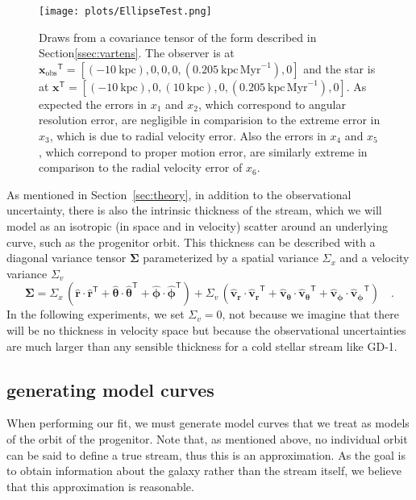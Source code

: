 \documentclass[12pt,preprint]{aastex}
\theoremstyle{plain}
\theoremstyle{definition}
\newcommand{\mtensor}[1]{\boldsymbol{#1}}
\newcommand{\mSigma}{\mtensor{\Sigma}}
\newcommand{\mvector}[1]{\mtensor{#1}}
\renewcommand{\vr}{\mvector{r}}
\newcommand{\vv}{\mvector{v}}
\newcommand{\vx}{\mvector{x}}
\newcommand{\vtheta}{\mvector{\theta}}
\newcommand{\vphi}{\mvector{\phi}}
\newcommand{\transpose}[1]{{#1}^{\textsf{T}}}
\newcommand{\rhat}{\hat{\vr}}
\newcommand{\thetahat}{\hat{\vtheta}}
\newcommand{\phihat}{\hat{\vphi}}
\newcommand{\vhat}{\hat{\vv}}
\newcommand{\unit}[1]{\mathrm{#1}}
\newcommand{\kpc}{\unit{kpc}}
\newcommand{\Myr}{\unit{Myr}}
\newcommand{\kpcpMyr}{\kpc\,\Myr^{-1}}
\newcommand{\vxobs}{\vx_{\mathrm{obs}}}
\newcommand{\sectionname}{Section}
\begin{document}
\begin{figure}[ht]
\begin{center}
\texttt{[image: plots/EllipseTest.png]}
\caption{Draws from a covariance tensor of the form described in \sectionname \ref{ssec:vartens}. The observer is at $\transpose{\vxobs} =  [(-10~\kpc), 0, 0, 0, (0.205~\kpcpMyr), 0]$ and the star is at $\transpose{\vx} = [(-10~\kpc), 0, (10~\kpc), 0, (0.205~\kpcpMyr), 0]$. As expected the errors in $x_1$ and $x_2$, which correspond to angular resolution error, are negligible in comparision to the extreme error in $x_3$, which is due to radial velocity error. Also the errors in $x_4$ and $x_5$, which correpond to proper motion error, are similarly extreme in comparison to the radial velocity error of $x_6$.}
\label{fig:EllipseTest}
\end{center}
\end{figure}

As mentioned in \sectionname~\ref{sec:theory}, in addition to the observational uncertainty, there is also the
intrinsic thickness of the stream, which we will model as an isotropic
(in space and in velocity) scatter around an underlying curve, such as the progenitor orbit.  This
thickness can be described with a diagonal variance tensor $\mSigma$
parameterized by a spatial variance $\Sigma_x$ and a velocity variance
$\Sigma_v$
\begin{equation}
\mSigma =
  \Sigma_x\,(\rhat\cdot\transpose{\rhat}
            +\thetahat\cdot\transpose{\thetahat}
            +\phihat\cdot\transpose{\phihat})
 +\Sigma_v\,(\vhat_{\vr}\cdot\transpose{\vhat_{\vr}}
            +\vhat_{\vtheta}\cdot\transpose{\vhat_{\vtheta}}
            +\vhat_{\vphi}\cdot\transpose{\vhat_{\vphi}})
\quad .
\end{equation}
In the following experiments, we set $\Sigma_v=0$, not because we imagine that
there will be no thickness in velocity space but because the
observational uncertainties are much larger than any sensible
thickness for a cold stellar stream like GD-1.

\subsection{generating model curves}
When performing our fit, we must generate model curves that we treat as models of the orbit of the progenitor. Note that, as mentioned above, no individual orbit can be said to define a true stream, thus this is an approximation. As the goal is to obtain information about the galaxy rather than the stream itself, we believe that this approximation is reasonable. 
\end{document}
